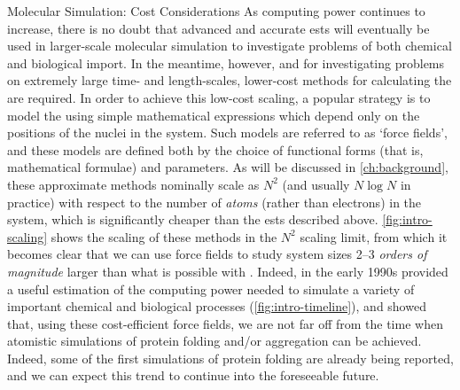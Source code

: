\begin{section}{Molecular Simulation: Cost Considerations}
As computing power continues to increase, there is no doubt that advanced and
accurate \glspl{est} will eventually be used in larger-scale molecular
simulation to investigate problems of both chemical and biological
import.\cite{Ballone2014} In
the meantime, however, and for investigating problems on extremely large time-
and length-scales, lower-cost methods for calculating the \pes are required.
In order to achieve this low-cost scaling, a popular strategy is to model the
\pes using simple mathematical expressions which depend only on the positions
of the nuclei in the system. Such models are referred to as `force fields',
and these models are defined both by the choice of functional forms (that is,
mathematical formulae) and parameters. 
As will be discussed in \cref{ch:background},
these approximate methods nominally scale as $N^2$ (and usually $N\log N$ in
practice) with respect
to the number of \emph{atoms} (rather than electrons) in the system, which is
significantly cheaper than the \glspl{est} described above.
\cref{fig:intro-scaling} shows the scaling of these methods in the $N^2$
scaling limit, from which it becomes clear that we can use force fields
to study system sizes 2--3 \emph{orders of magnitude} larger than what is
possible with \est.
%
Indeed, in the early 1990s \citet{Chan1993} provided a useful estimation
of the computing power needed to simulate a variety of 
important chemical and biological processes (\cref{fig:intro-timeline}), and showed that,
using these cost-efficient force fields,
we are not far off from the time when atomistic simulations of protein folding and/or aggregation
can be achieved.
Indeed, some of the first simulations of protein
folding are already being reported, and we can expect this trend to continue
into the foreseeable future.\cite{Lane2013}



\end{section}
